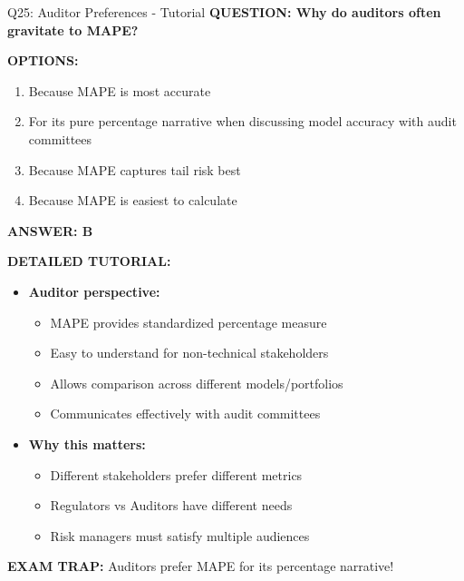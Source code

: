 \documentclass[8pt]{beamer}
\begin{document}
	\begin{frame}{Q25: Auditor Preferences - Tutorial}
		\fontsize{6.5}{7.5}\selectfont
		\textbf{QUESTION: Why do auditors often gravitate to MAPE?}
		
		\vspace{0.1cm}
		\textbf{OPTIONS:}
		\begin{enumerate}
			\item Because MAPE is most accurate
			\item For its pure percentage narrative when discussing model accuracy with audit committees
			\item Because MAPE captures tail risk best
			\item Because MAPE is easiest to calculate
		\end{enumerate}
		
		\vspace{0.1cm}
		\textcolor{myblue}{\textbf{ANSWER: B}}
		
		\vspace{0.1cm}
		\textbf{DETAILED TUTORIAL:}
		\begin{itemize}
			\item \textbf{Auditor perspective:}
			\begin{itemize}
				\item MAPE provides standardized percentage measure
				\item Easy to understand for non-technical stakeholders
				\item Allows comparison across different models/portfolios
				\item Communicates effectively with audit committees
			\end{itemize}
			\item \textbf{Why this matters:}
			\begin{itemize}
				\item Different stakeholders prefer different metrics
				\item Regulators vs Auditors have different needs
				\item Risk managers must satisfy multiple audiences
			\end{itemize}
		\end{itemize}
		
		\textcolor{myred}{\textbf{EXAM TRAP:}} Auditors prefer MAPE for its \textcolor{myblue}{percentage narrative}! 
	\end{frame}
	
	
\end{document}
